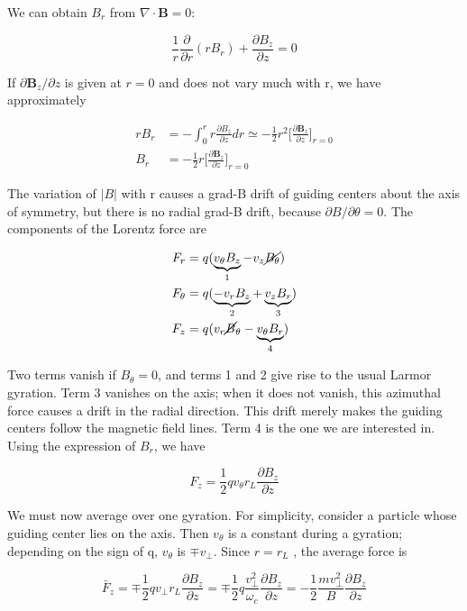 \documentclass[
  notoc %
]{tufte-book}
\begin{document}
We can obtain \(B_r\) from \(\nabla\cdot\mathbf{B} = 0\):

\[
\frac{1}{r}\frac{\partial}{\partial r}(rB_r) + \frac{\partial B_z}{\partial z} = 0
\]

If \(\partial \mathbf{B}_z/\partial z\) is given at \(r=0\) and does not
vary much with r, we have approximately

\[
\begin{aligned}
rB_r &= -\int_0^r r\frac{\partial B_z}{\partial z}dr \simeq -\frac{1}{2}r^2 \Big[ \frac{\partial \mathbf{B}_z}{\partial z} \Big]_{r=0} \\
B_r &= -\frac{1}{2}r \Big[ \frac{\partial \mathbf{B}_z}{\partial z} \Big]_{r=0}
\end{aligned}
\]

The variation of \(|B|\) with r causes a grad-B drift of guiding centers
about the axis of symmetry, but there is no radial grad-B drift, because
\(\partial B/\partial \theta = 0\). The components of the Lorentz force
are

\[
\begin{aligned}
F_r &= q(\underbrace{v_\theta B_z}_{\small{1}} - v_z \cancel{B_\theta}) \\
F_\theta &= q(\underbrace{-v_r B_z}_{\small{2}} + \underbrace{v_z B_r}_{\small{3}}) \\
F_z &= q(v_r \cancel{B}_\theta - \underbrace{v_\theta B_r}_{\small{4}})
\end{aligned}
\]

Two terms vanish if \(B_\theta = 0\), and terms 1 and 2 give rise to the
usual Larmor gyration. Term 3 vanishes on the axis; when it does not
vanish, this azimuthal force causes a drift in the radial direction.
This drift merely makes the guiding centers follow the magnetic field
lines. Term 4 is the one we are interested in. Using the expression of
\(B_r\), we have

\[
F_z = \frac{1}{2}q v_\theta r_L \frac{\partial B_z}{\partial z}
\]

We must now average over one gyration. For simplicity, consider a
particle whose guiding center lies on the axis. Then \(v_\theta\) is a
constant during a gyration; depending on the sign of q, \(v_\theta\) is
\(\mp v_\perp\). Since \(r = r_L\) , the average force is

\[
\bar{F}_z = \mp \frac{1}{2}q v_\perp r_L \frac{\partial B_z}{\partial z} = \mp \frac{1}{2}q\frac{v_\perp^2}{\omega_c} \frac{\partial B_z}{\partial z} = -\frac{1}{2}\frac{mv_\perp^2}{B} \frac{\partial B_z}{\partial z}
\]
\end{document}
